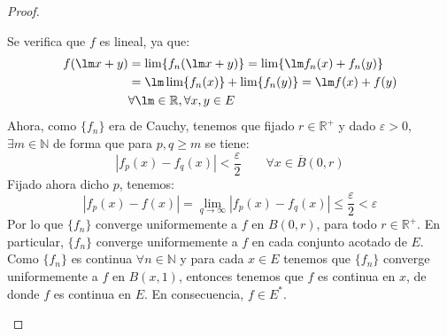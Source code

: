 \begin{prop}
\begin{proof}
\begin{enumerate}
                Se verifica que $f$ es lineal, ya que:
                \begin{align*}
                    f(\lm x + y) &= \lim \{f_n(\lm x + y)\} = \lim \{\lm f_n(x)  + f_n(y)\} \\ &= \lm \lim\{f_n(x)\} +  \lim\{f_n(y)\} = \lm f(x) + f(y) \\
                                 & \forall \lm \in \mathbb{R}, \forall x,y\in E
                \end{align*}
                Ahora, como $\{f_n\}$ era de Cauchy, tenemos que fijado $r\in \mathbb{R}^+$ y dado $\varepsilon>0$, $\exists m\in \mathbb{N}$ de forma que para $p,q\geq m$ se tiene:
                \begin{equation*}
                    |f_p(x) - f_q(x)| < \dfrac{\varepsilon}{2} \qquad \forall x\in \overline{B}(0,r)
                \end{equation*}
                Fijado ahora dicho $p$, tenemos:
                \begin{equation*}
                    |f_p(x) - f(x)| = \lim_{q\to \infty} |f_p(x) - f_q(x)| \leq \dfrac{\varepsilon}{2} < \varepsilon
                \end{equation*}
                Por lo que $\{f_n\}$ converge uniformemente a $f$ en $B(0,r)$, para todo $r\in \mathbb{R}^+$. En particular, $\{f_n\}$ converge uniformemente a $f$ en cada conjunto acotado de $E$. Como $\{f_n\}$  es continua $\forall n\in \mathbb{N}$ y para cada $x\in E$ tenemos que $\{f_n\}$ converge uniformemente a $f$ en $B(x,1)$, entonces tenemos que $f $ es continua en $x$, de donde $f$ es continua en $E$. En consecuencia, $f\in E^\ast$.


\end{enumerate}
\end{proof}
\end{prop}
